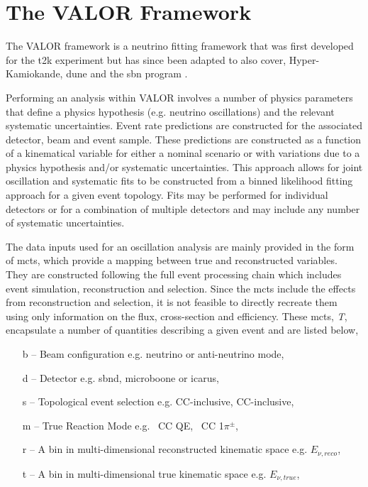 \section{The VALOR Framework}\label{sec:VALOR_framework}
The VALOR framework is a neutrino fitting framework that was first developed for the \gls{t2k} experiment but has since been adapted to also cover, Hyper-Kamiokande, \gls{dune} and the \gls{sbn} program \cite{VALOR}.

Performing an analysis within VALOR involves a number of physics parameters that define a physics hypothesis (e.g. neutrino oscillations) and the relevant systematic uncertainties. Event rate predictions are constructed for the associated detector, beam and event sample. These predictions are constructed as a function of a kinematical variable for either a nominal scenario or with variations due to a physics hypothesis and/or systematic uncertainties. This approach allows for joint oscillation and systematic fits to be constructed from a binned likelihood fitting approach for a given event topology. Fits may be performed for individual detectors or for a combination of multiple detectors and may include any number of systematic uncertainties. 



The data inputs used for an oscillation analysis are mainly provided in the form of \glspl{mct}, which provide a mapping between true and reconstructed variables. They are constructed following the full event processing chain which includes event simulation, reconstruction and selection. Since the \glspl{mct} include the effects from reconstruction and selection, it is not feasible to directly recreate them using only information on the flux, cross-section and efficiency. These \glspl{mct}, \textit{T}, encapsulate a number of quantities describing a given event and are listed below,

\begin{itemize}
    \item[b] -- Beam configuration e.g. neutrino or anti-neutrino mode,
    \item[d] -- Detector e.g. \gls{sbnd}, \gls{microboone} or \gls{icarus},
    \item[s] -- Topological event selection e.g. \nue CC-inclusive, \numu CC-inclusive,
    \item[m] -- True Reaction Mode e.g. \numu~CC QE, \nue~CC 1$\pi^{\pm}$,
    \item[r] -- A bin in multi-dimensional reconstructed kinematic space e.g. $E_{\nu, reco}$,
    \item[t] -- A bin in multi-dimensional true kinematic space e.g. $E_{\nu, true}$,
\end{itemize}

